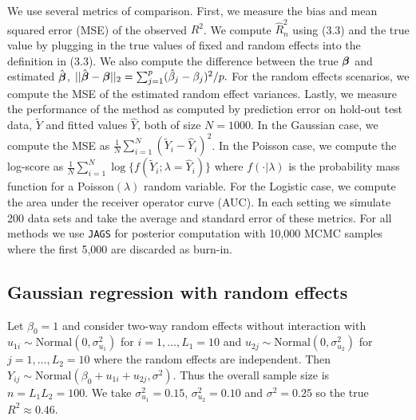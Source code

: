 \documentclass[12pt]{article}
\begin{document}
We use several metrics of comparison. First, we measure the bias and mean squared error (MSE) of the observed $R^2$. We compute $\hat R^2_n$ using (3.3) and the true value by plugging in the true values of fixed and random effects into the definition in (3.3). We also compute the difference between the true $\mbox{\boldmath $\beta$}$ and estimated $\hat{\mbox{\boldmath $\beta$}}$,
$
    ||\hat{\mbox{\boldmath $\beta$}}-\mbox{\boldmath $\beta$}||_2
    =\sum_{j=1}^p (\hat\beta_j-\beta_j)^2/p.
$
For the random effects scenarios, we compute the MSE of the estimated random effect variances. Lastly, we measure the performance of the method as computed by prediction error on hold-out test data, $\tilde Y$ and fitted values $\hat Y$, both of size $N=1000$. In the Gaussian case, we compute the MSE as $\frac1N\sum_{i=1}^N(\tilde Y_i-\hat Y_i)^2$. In the Poisson case, we compute the log-score as
$
    \frac1N\sum_{i=1}^N \log\{f(\tilde Y_i;\lambda=\hat Y_i)\}
$
where $f(\cdot|\lambda)$ is the probability mass function for a Poisson$(\lambda)$ random variable. For the Logistic case, we compute the area under the receiver operator curve (AUC). In each setting we simulate 200 data sets and take the average and standard error of these metrics. For all methods we use {\tt JAGS} \citep{plummer2016} for posterior computation with 10,000 MCMC samples where the first 5,000 are discarded as burn-in.


\subsection{Gaussian regression with random effects}
Let $\beta_0=1$ and consider two-way random effects without interaction with $u_{1i}\sim\mbox{Normal}(0,\sigma^2_{u_1})$ for $i=1,\dots,L_1=10$ and $u_{2j}\sim\mbox{Normal}(0,\sigma^2_{u_2})$ for $j=1,\dots,L_2=10$ where the random effects are independent. Then $Y_{ij}\sim\mbox{Normal}(\beta_0+u_{1i}+u_{2j}, \sigma^2)$. Thus the overall sample size is $n=L_1L_2=100$. We take $\sigma^2_{u_1}=0.15$, $\sigma^2_{u_2}=0.10$ and $\sigma^2=0.25$ so the true $R^2\approx 0.46$.
\end{document}
